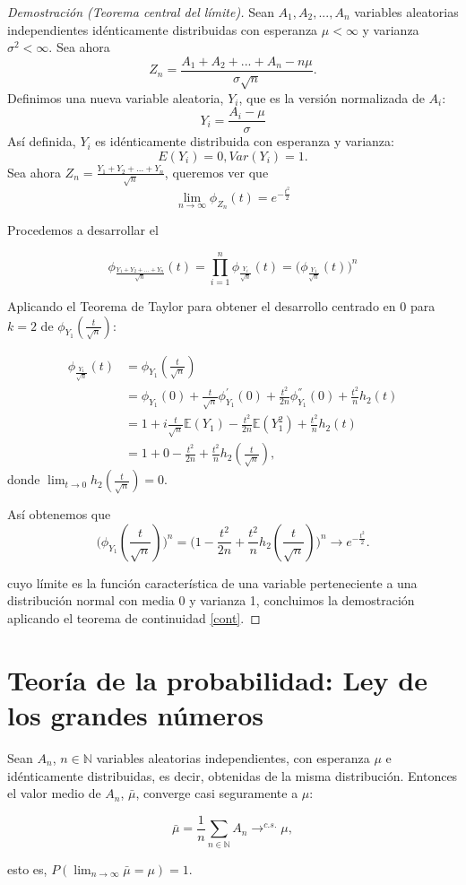 \documentclass[../proyecto.tex]{memoir}
\begin{document}
\begin{proof}[Demostración (Teorema central del límite)]

Sean $A_{1},A_{2},...,A_{n}$ variables aleatorias independientes idénticamente distribuidas con esperanza $\mu < \infty$ y varianza $\sigma^2< \infty$.
Sea ahora $$
Z_{n} = \frac{A_{1}+A_{2}+...+A_{n}-n\mu }{\sigma \sqrt{n}}.
$$
Definimos una nueva variable aleatoria, $Y_i$, que es la versión normalizada de $A_i$:$$
Y_i=\frac{A_i-\mu}{\sigma}
$$
Así definida, $Y_i$ es idénticamente distribuida con esperanza y varianza: $$
E(Y_{i}) = 0,  Var(Y_{i})=1.
$$
Sea ahora $Z_n = \frac{Y_1+Y_2+...+Y_n}{\sqrt{n}}$, queremos ver que $$
\lim_{n \to \infty} \phi_{Z_{n}}(t)=e^{-\frac{t^{2}}{2}}
$$

Procedemos a desarrollar el

$$
\phi_{\frac{Y_1+Y_2+...+Y_n}{\sqrt{n}}}(t) = \prod_{i=1}^{n} \phi_{\frac{Y_i}{\sqrt{n}}} (t) = \big(\phi_{\frac{Y_1}{\sqrt{n}}}(t) \big)^n
$$

Aplicando el Teorema de Taylor para obtener el desarrollo centrado en 0 para $k=2$ de $\phi_{Y_1}(\frac{t}{\sqrt{n}})$: 

\begin{align*}
\phi_{\frac{Y_1}{\sqrt{n}}}(t) &= \phi_{Y_1}(\frac{t}{\sqrt{n}}) \\
  &= \phi_{Y_1}(0) + \frac{t}{\sqrt{n}}\phi_{Y_1}^{'}(0) + \frac{t^2}{2n}\phi_{Y_1}^{''}(0) + \frac{t^2}{n} h_2(t)\\
 &= 1 + i\frac{t}{\sqrt{n}}\mathds{E}(Y_1) - \frac{t^2}{2n}\mathds{E}(Y_1^2) + \frac{t^2}{n} h_2(t)\\
 &= 1 + 0 - \frac{t^2}{2n} + \frac{t^2}{n} h_2(\frac{t}{\sqrt{n}}),
\end{align*}
donde $\lim_{t\to 0} h_2(\frac{t}{\sqrt{n}}) = 0$.

Así obtenemos que $$
\big(\phi_{Y_1}(\frac{t}{\sqrt{n}}) \big)^n =\big( 1 - \frac{t^2}{2n} + \frac{t^2}{n} h_2(\frac{t}{\sqrt{n}}) \big)^n\longrightarrow e^{-\frac{t^2}{2}}.
$$

cuyo límite es la función característica de una variable perteneciente a una distribución normal con media 0 y varianza 1, concluimos la demostración aplicando el teorema de continuidad \ref{cont}.
\end{proof}

\section{Teoría de la probabilidad: Ley de los grandes números}
\begin{teorema} \label{teo_grandes_numeros}
Sean $A_n$, $n \in \mathds{N}$ variables aleatorias independientes, con esperanza $\mu$ e idénticamente distribuidas, es decir, obtenidas de la misma distribución. Entonces el valor medio de $A_n$, $\bar{\mu}$, converge casi seguramente a $\mu$:

$$
\bar{\mu}=\frac{1}{n}\sum_{n\in\mathds{N}} A_n \to^{c.s.} \mu,
$$

esto es, $P(\lim_{n\to\infty} \bar{\mu}=\mu) = 1$.

\end{teorema}
\end{document}
